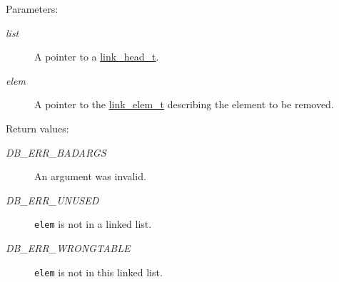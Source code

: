 \begin{Desc}
\item[Parameters:]
\begin{description}
\item[{\em list}]A pointer to a \hyperlink{group__dbprim__link_a0}{link\_\-head\_\-t}. \item[{\em elem}]A pointer to the \hyperlink{group__dbprim__link_a1}{link\_\-elem\_\-t} describing the element to be removed.\end{description}
\end{Desc}
\begin{Desc}
\item[Return values:]
\begin{description}
\item[{\em DB\_\-ERR\_\-BADARGS}]An argument was invalid. \item[{\em DB\_\-ERR\_\-UNUSED}]{\tt elem} is not in a linked list. \item[{\em DB\_\-ERR\_\-WRONGTABLE}]{\tt elem} is not in this linked list. \end{description}
\end{Desc}
